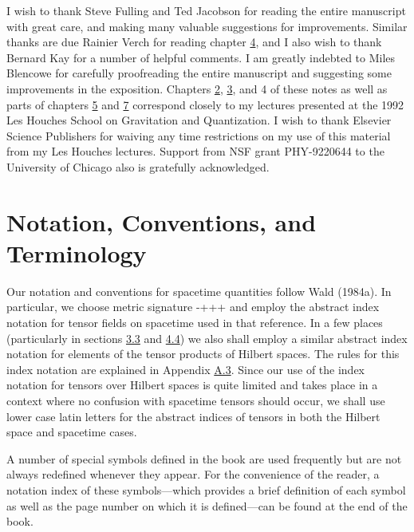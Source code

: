 \documentclass[11pt,a4paper]{article}
\begin{document}
I wish to thank Steve Fulling and Ted Jacobson for reading the entire manuscript with great care, and making many valuable suggestions for improvements. Similar thanks are due Rainier Verch for reading chapter \hyperlink{sec:4}{4}, and I also wish to thank Bernard Kay for a number of helpful comments. I am greatly indebted to Miles Blencowe for carefully proofreading the entire manuscript and suggesting some improvements in the exposition. Chapters \hyperlink{sec:2}{2}, \hyperlink{sec:3}{3}, and 4 of these notes as well as parts of chapters \hyperlink{sec:5}{5} and \hyperlink{sec:7}{7} correspond closely to my lectures presented at the 1992 Les Houches School on Gravitation and Quantization. I wish to thank Elsevier Science Publishers for waiving any time restrictions on my use of this material from my Les Houches lectures. Support from NSF grant PHY-9220644 to the University of Chicago also is gratefully acknowledged.

\clearpage
\hypertarget{source-11}{}
\section*{Notation, Conventions, and Terminology}

Our notation and conventions for spacetime quantities follow Wald (1984a). In particular, we choose metric signature -+++ and employ the abstract index notation for tensor fields on spacetime used in that reference. In a few places (particularly in sections \hyperlink{sec:3.3}{3.3} and \hyperlink{sec:4.4}{4.4}) we also shall employ a similar abstract index notation for elements of the tensor products of Hilbert spaces. The rules for this index notation are explained in Appendix \hyperlink{sec:A.3}{A.3}. Since our use of the index notation for tensors over Hilbert spaces is quite limited and takes place in a context where no confusion with spacetime tensors should occur, we shall use lower case latin letters for the abstract indices of tensors in both the Hilbert space and spacetime cases.

A number of special symbols defined in the book are used frequently but are not always redefined whenever they appear. For the convenience of the reader, a notation index of these symbols---which provides a brief definition of each symbol as well as the page number on which it is defined---can be found at the end of the book.
\end{document}
